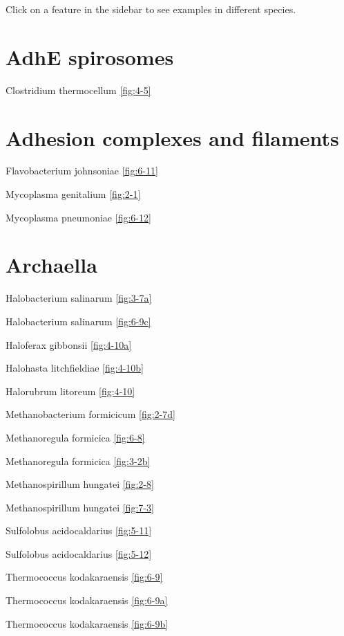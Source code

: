 \documentclass[]{tufte-book}
\begin{document}
Click on a feature in the sidebar to see examples in different species.

\hypertarget{adhe-spirosomes}{%
\section*{AdhE spirosomes}\label{adhe-spirosomes}}

Clostridium thermocellum \ref{fig:4-5}

\hypertarget{adhesion-complexes-and-filaments}{%
\section*{Adhesion complexes and filaments}\label{adhesion-complexes-and-filaments}}

Flavobacterium johnsoniae \ref{fig:6-11}

Mycoplasma genitalium \ref{fig:2-1}

Mycoplasma pneumoniae \ref{fig:6-12}

\hypertarget{archaella}{%
\section*{Archaella}\label{archaella}}

Halobacterium salinarum \ref{fig:3-7a}

Halobacterium salinarum \ref{fig:6-9c}

Haloferax gibbonsii \ref{fig:4-10a}

Halohasta litchfieldiae \ref{fig:4-10b}

Halorubrum litoreum \ref{fig:4-10}

Methanobacterium formicicum \ref{fig:2-7d}

Methanoregula formicica \ref{fig:6-8}

Methanoregula formicica \ref{fig:3-2b}

Methanospirillum hungatei \ref{fig:2-8}

Methanospirillum hungatei \ref{fig:7-3}

Sulfolobus acidocaldarius \ref{fig:5-11}

Sulfolobus acidocaldarius \ref{fig:5-12}

Thermococcus kodakaraensis \ref{fig:6-9}

Thermococcus kodakaraensis \ref{fig:6-9a}

Thermococcus kodakaraensis \ref{fig:6-9b}
\end{document}
